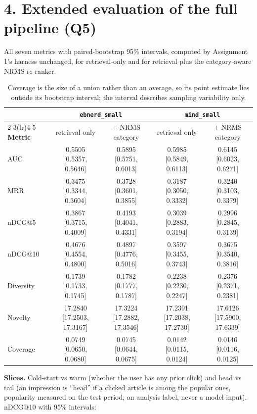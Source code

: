 \documentclass[11pt,a4paper]{article}
\begin{document}
\section*{4. Extended evaluation of the full pipeline (Q5)}

All seven metrics with paired-bootstrap 95\% intervals, computed by Assignment
1's harness unchanged, for retrieval-only and for retrieval plus the
category-aware NRMS re-ranker.

\begin{table}[H]
\centering\scriptsize
\setlength{\tabcolsep}{3pt}
\begin{tabular}{lcccc}
\toprule
 & \multicolumn{2}{c}{\texttt{ebnerd\_small}} & \multicolumn{2}{c}{\texttt{mind\_small}} \\
\cmidrule(lr){2-3}\cmidrule(lr){4-5}
\textbf{Metric} & retrieval only & + NRMS category & retrieval only & + NRMS category \\
\midrule
AUC & 0.5505 [0.5357, 0.5646] & 0.5895 [0.5751, 0.6013] & 0.5985 [0.5849, 0.6113] & 0.6145 [0.6023, 0.6271] \\
MRR & 0.3475 [0.3344, 0.3604] & 0.3728 [0.3601, 0.3855] & 0.3187 [0.3050, 0.3332] & 0.3240 [0.3103, 0.3379] \\
nDCG@5 & 0.3867 [0.3715, 0.4009] & 0.4193 [0.4041, 0.4331] & 0.3039 [0.2883, 0.3194] & 0.2996 [0.2845, 0.3139] \\
nDCG@10 & 0.4676 [0.4554, 0.4800] & 0.4897 [0.4776, 0.5016] & 0.3597 [0.3455, 0.3743] & 0.3675 [0.3540, 0.3816] \\
Diversity & 0.1739 [0.1733, 0.1745] & 0.1782 [0.1777, 0.1787] & 0.2238 [0.2230, 0.2247] & 0.2376 [0.2371, 0.2381] \\
Novelty & 17.2840 [17.2503, 17.3167] & 17.3224 [17.2882, 17.3546] & 17.2391 [17.2038, 17.2730] & 17.6126 [17.5900, 17.6339] \\
Coverage & 0.0749 [0.0650, 0.0680] & 0.0745 [0.0644, 0.0675] & 0.0142 [0.0115, 0.0124] & 0.0146 [0.0116, 0.0125] \\
\bottomrule
\end{tabular}
\caption{Coverage is the size of a union rather than an average, so its point estimate lies outside its bootstrap interval; the interval describes sampling variability only.}
\end{table}

\textbf{Slices.} Cold-start vs warm (whether the user has any prior click) and
head vs tail (an impression is ``head'' if a clicked article is among the
popular ones, popularity measured on the test period; an analysis label, never a
model input). nDCG@10 with 95\% intervals:
\end{document}
